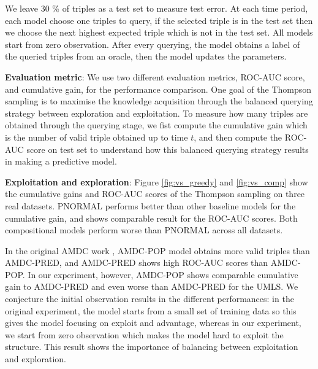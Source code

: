We leave 30 \% of triples as a test set to measure test error. 
At each time period, each model choose one triples to query, 
if the selected triple is in the test set then we choose the next highest expected triple which is not in the test set.
All models start from zero observation. 
After every querying, the model obtains a label of the queried triples from an oracle,
then the model updates the parameters. 

\textbf{Evaluation metric}: We use two different evaluation metrics, ROC-AUC score, and cumulative gain,
for the performance comparison. One goal of the Thompson sampling is to maximise the knowledge 
acquisition through the balanced querying strategy between exploration and exploitation. 
To measure how many triples are obtained through the querying stage, we fist compute the cumulative 
gain which is the number of valid triple obtained up to time $t$, and then compute the ROC-AUC score on 
test set to understand how this balanced querying strategy results in making a predictive model.

\textbf{Exploitation and exploration}: 
Figure \ref{fig:vs_greedy} and \ref{fig:vs_comp} show
the cumulative gains and ROC-AUC scores of the Thompson sampling on three real datasets.
PNORMAL performs better than other baseline models for the cumulative gain, and shows comparable result for the ROC-AUC scores. Both compositional models perform worse than PNORMAL across all datasets.

In the original AMDC work \cite{kajino2015active}, AMDC-POP model obtains more 
valid triples than AMDC-PRED, and AMDC-PRED shows high ROC-AUC scores than AMDC-POP. 
In our experiment, however, AMDC-POP shows comparable cumulative gain to AMDC-PRED 
and even worse than AMDC-PRED for the UMLS. We conjecture the initial observation 
results in the  different performances: in the original experiment, the model starts
from a small set of training data so this gives the model focusing on exploit and advantage, 
whereas in our experiment, we start from zero 
observation which makes the model hard to exploit the structure. This result shows 
the importance of balancing between exploitation and exploration.

